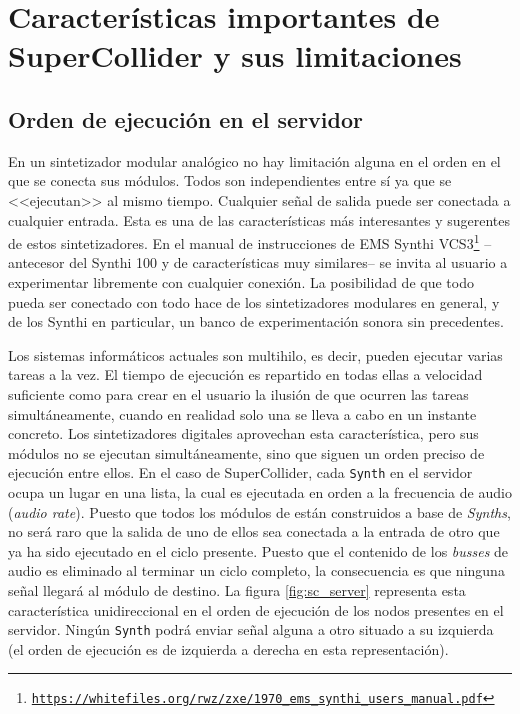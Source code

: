 \section[Características de SuperCollider]{Características importantes de SuperCollider y sus limitaciones}
\label{sec:sc_features}

\subsection{Orden de ejecución en el servidor}
En un sintetizador modular analógico no hay limitación alguna en el orden en el que se conecta sus módulos. Todos son independientes entre sí ya que se <<ejecutan>> al mismo tiempo. Cualquier señal de salida puede ser conectada a cualquier entrada. Esta es una de las características más interesantes y sugerentes de estos sintetizadores. En el manual de instrucciones de EMS Synthi VCS3\footnote{\href{https://whitefiles.org/rwz/zxe/1970\_ems\_synthi\_users\_manual.pdf}{\texttt{https://whitefiles.org/rwz/zxe/1970\_ems\_synthi\_users\_manual.pdf}}} --antecesor del Synthi 100 y de características muy similares-- se invita al usuario a experimentar libremente con cualquier conexión. La posibilidad de que todo pueda ser conectado con todo hace de los sintetizadores modulares en general, y de los Synthi en particular, un banco de experimentación sonora sin precedentes.

Los sistemas informáticos actuales son multihilo, es decir, pueden ejecutar varias tareas a la vez. El tiempo de ejecución es repartido en todas ellas a velocidad suficiente como para crear en el usuario la ilusión de que ocurren las tareas simultáneamente, cuando en realidad solo una se lleva a cabo en un instante concreto. Los sintetizadores digitales aprovechan esta característica, pero sus módulos no se ejecutan simultáneamente, sino que siguen un orden preciso de ejecución entre ellos. En el caso de SuperCollider, cada \texttt{Synth} en el servidor ocupa un lugar en una lista, la cual es ejecutada en orden a la frecuencia de audio (\textit{audio rate}). Puesto que todos los módulos de \appName están construidos a base de \textit{Synths}, no será raro que la salida de uno de ellos sea conectada a la entrada de otro que ya ha sido ejecutado en el ciclo presente. Puesto que el contenido de los \textit{busses} de audio es eliminado al terminar un ciclo completo, la consecuencia es que ninguna señal llegará al módulo de destino. La figura \ref{fig:sc_server} representa esta característica unidireccional en el orden de ejecución de los nodos presentes en el servidor. Ningún \texttt{Synth} podrá enviar señal alguna a otro situado a su izquierda (el orden de ejecución es de izquierda a derecha en esta representación).


